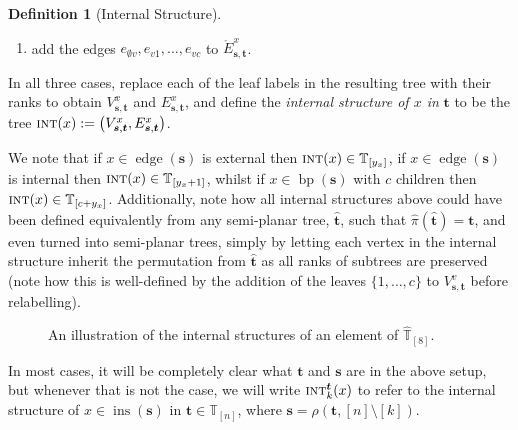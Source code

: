 \documentclass[a4paper, final]{amsart}
\theoremstyle{plain}
\theoremstyle{definition}
\newtheorem{defi}[thm]{Definition}
\newcommand{\tree}[1][t]{\boldsymbol{#1}}
\newcommand{\that}[1][t]{\hat{\boldsymbol{#1}}} %
\newcommand{\Thatspace}[1][\T]{\widehat{\boldsymbol{#1}}} %
\newcommand{\T}{\mathbb{T}}
\DeclareMathOperator{\edge}{edge}
\DeclareMathOperator{\insertable}{ins}
\DeclareMathOperator{\branchpoints}{bp}
\DeclareMathOperator{\intstruct}{\textsc{int}}
\newcommand{\insertablef}[1][\tree]{\insertable({\tree[#1]})}
\begin{document}
\begin{defi}[Internal Structure]
\begin{itemize}
\begin{enumerate}
            \item add the edges $e_{\emptyset v}, e_{v1}, \ldots, e_{vc}$ to $\mathring{E}_{\tree[s], \tree}^x$.
          \end{enumerate}
      \end{itemize}
    In all three cases, replace each of the leaf labels in the resulting tree with their ranks to obtain $V_{\tree[s], \tree}^x$ and $E_{\tree[s], \tree}^x$, and define the \textit{internal structure of $x$ in} $\tree$ to be the tree $\intstruct(x) := \left( V_{\tree[s], \tree}^x, E_{\tree[s], \tree}^x \right)$.
      \label{def:internalstructure}  
\end{defi}
%
We note that if $x \in \edge (\tree[s])$ is external then $\intstruct (x) \in \T_{[y_x]}$, if $x \in \edge (\tree[s])$ is internal then $\intstruct (x) \in \T_{[y_x + 1]}$, whilst if $x \in \branchpoints(\tree[s])$ with $c$ children then $\intstruct (x) \in \T_{[c + {y_x}]}$.
Additionally, note how all internal structures above could have been defined equivalently from any semi-planar tree, $\that$, such that $\hat{\pi} (\that) = \tree$, and even turned into semi-planar trees, simply by letting each vertex in the internal structure inherit the permutation from $\that$ as all ranks of subtrees are preserved (note how this is well-defined by the addition of the leaves $\{1, \ldots, c\}$ to $V_{\tree[s], \tree}^v$ before relabelling).
%
\begin{figure}[t!]
  \centering
  
  \caption{An illustration of the internal structures of an element of $\Thatspace_{[8]}$.}
  \label{fig:decoratedtrees_internalstructure}
\end{figure}
%
In most cases, it will be completely clear what $\tree$ and $\tree[s]$ are in the above setup, but whenever that is not the case, we will write $\intstruct_k^{\tree}(x)$ to refer to the internal structure of $x \in \insertablef[s]$ in $\tree \in \T_{[n]}$, where $\tree[s] = \rho \left( \tree, [n] \setminus [k] \right)$.
\end{document}
